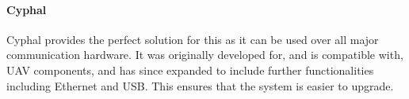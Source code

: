 \paragraph{Cyphal}
Cyphal provides the perfect solution for this as it can be used over all major communication hardware. It was originally developed for, and is compatible with, \gls{UAV} components, and has since expanded to include further functionalities including Ethernet and \gls{USB}. This ensures that the system is easier to upgrade.
